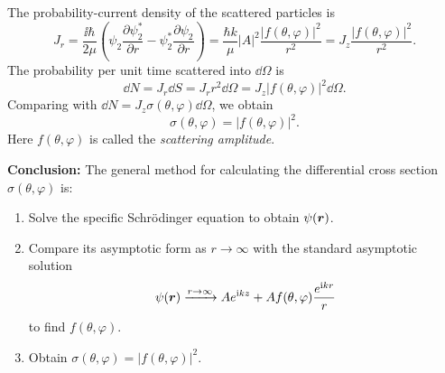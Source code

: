 The probability-current density of the scattered particles is
\begin{equation}
J_r=\frac{\ii\hbar}{2\mu}\left(\psi_2\frac{\partial\psi_2^*}{\partial r}-\psi_2^*\frac{\partial\psi_2}{\partial r}\right)
=\frac{\hbar k}{\mu}|A|^2\frac{|f(\theta,\varphi)|^2}{r^2}
=J_z\frac{|f(\theta,\varphi)|^2}{r^2}.
\end{equation}
The probability per unit time scattered into $\dd\Omega$ is
\begin{equation}
\dd N=J_r\dd S=J_r r^2\dd\Omega=J_z|f(\theta,\varphi)|^2\dd\Omega.
\end{equation}
Comparing with $\dd N=J_z\sigma(\theta,\varphi)\dd\Omega$, we obtain
\begin{equation}
\boxed{\sigma(\theta,\varphi)=|f(\theta,\varphi)|^2}.
\end{equation}
Here $f(\theta,\varphi)$ is called the \emph{scattering amplitude}.

\textbf{Conclusion:} The general method for calculating the differential cross section $\sigma(\theta,\varphi)$ is:
\begin{enumerate}
\item Solve the specific Schr\"odinger equation to obtain $\psi(\bm{r})$.
\item Compare its asymptotic form as $r\to\infty$ with the standard asymptotic solution
\begin{equation}
\psi(\bm{r})\xrightarrow{r\to\infty} Ae^{\mathrm{i} kz}+Af(\theta,\varphi)\frac{e^{\mathrm{i} kr}}r
\end{equation}
to find $f(\theta,\varphi)$.
\item Obtain $\sigma(\theta,\varphi)=|f(\theta,\varphi)|^2$.
\end{enumerate}